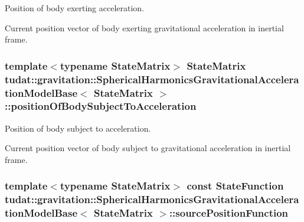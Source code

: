 Position of body exerting acceleration. 

Current position vector of body exerting gravitational acceleration in inertial frame. 
\subsubsection[{\texorpdfstring{position\+Of\+Body\+Subject\+To\+Acceleration}{positionOfBodySubjectToAcceleration}}]{\setlength{\rightskip}{0pt plus 5cm}template$<$typename State\+Matrix$>$ State\+Matrix {\bf tudat\+::gravitation\+::\+Spherical\+Harmonics\+Gravitational\+Acceleration\+Model\+Base}$<$ State\+Matrix $>$\+::position\+Of\+Body\+Subject\+To\+Acceleration\hspace{0.3cm}{\ttfamily [protected]}}\hypertarget{classtudat_1_1gravitation_1_1SphericalHarmonicsGravitationalAccelerationModelBase_a0e873e80f5b4654243def79fc89a8f9b}{}\label{classtudat_1_1gravitation_1_1SphericalHarmonicsGravitationalAccelerationModelBase_a0e873e80f5b4654243def79fc89a8f9b}


Position of body subject to acceleration. 

Current position vector of body subject to gravitational acceleration in inertial frame. 
\subsubsection[{\texorpdfstring{source\+Position\+Function}{sourcePositionFunction}}]{\setlength{\rightskip}{0pt plus 5cm}template$<$typename State\+Matrix$>$ const {\bf State\+Function} {\bf tudat\+::gravitation\+::\+Spherical\+Harmonics\+Gravitational\+Acceleration\+Model\+Base}$<$ State\+Matrix $>$\+::source\+Position\+Function\hspace{0.3cm}{\ttfamily [protected]}}\hypertarget{classtudat_1_1gravitation_1_1SphericalHarmonicsGravitationalAccelerationModelBase_a90738dd2d368872dc3ac4b163ab98ece}{}\label{classtudat_1_1gravitation_1_1SphericalHarmonicsGravitationalAccelerationModelBase_a90738dd2d368872dc3ac4b163ab98ece}


